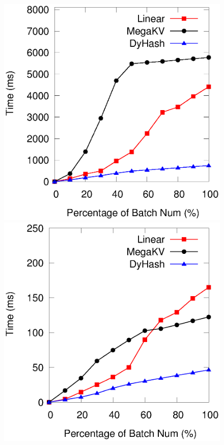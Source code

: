\begin{figure}[h]
\begin{minipage}{0.18\linewidth}
		\centerline{\dsreddit}
	\end{minipage}
	\hfill
	\begin{minipage}{0.18\linewidth}\centering
		\includegraphics[width=\linewidth]{pic/dynamic-stability/dynamic-sta-tpch.eps}
		\centerline{\dstpch}
	\end{minipage}
	\hfill
	\begin{minipage}{0.18\linewidth}\centering
		\includegraphics[width=\linewidth]{pic/dynamic-stability/dynamic-sta-ali.eps}

\end{minipage}
\end{figure}
